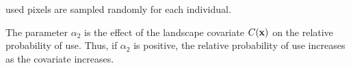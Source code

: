 used pixels are sampled randomly for each individual.

The parameter $\alpha_2$ is the effect of the
landscape covariate $C({\bf x})$ on the relative probability of
use. Thus, if $\alpha_2$ is positive, the relative probability of use
increases as the covariate increases.


